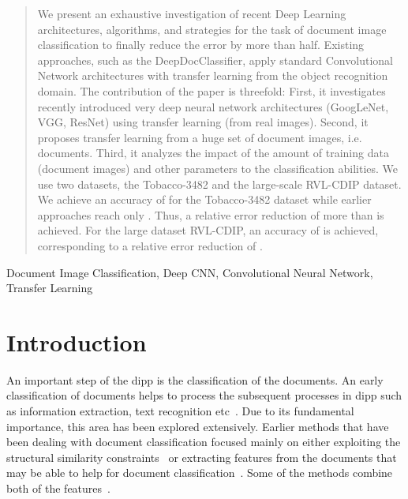 \documentclass[conference]{IEEEtran}
\begin{document}
\IEEEpeerreviewmaketitle
\begin{abstract}



We present an exhaustive investigation of recent Deep Learning architectures, algorithms, and strategies for the task of document image classification to finally reduce the error by more than half.
Existing approaches, such as the DeepDocClassifier, apply standard Convolutional Network architectures with transfer learning from the object recognition domain.
The contribution of the paper is threefold:
First, it investigates recently introduced very deep neural network architectures (GoogLeNet, VGG, ResNet) using transfer learning (from real images). 
Second, it proposes transfer learning from a huge set of document images, i.e.  documents. 
Third, it analyzes the impact of the amount of training data (document images) and other parameters to the classification abilities. 
We use two datasets, the Tobacco-3482 and the large-scale RVL-CDIP dataset.
We achieve an accuracy of  for the Tobacco-3482 dataset while earlier approaches reach only . Thus, a relative error reduction of more than  is achieved. For the large dataset RVL-CDIP, an accuracy of  is achieved, corresponding to a relative error reduction of .














\end{abstract}

\begin{IEEEkeywords}
Document Image Classification, Deep CNN, Convolutional Neural Network, Transfer Learning
\end{IEEEkeywords}



%
 
\section{Introduction}

An important step of the \ac{dipp} is the classification of the documents. 
An early classification of documents helps to process the subsequent processes in \ac{dipp} such as information extraction, text recognition etc~\cite{doclass_Dengel95}. Due to its fundamental importance, this area has been explored extensively. 
Earlier methods that have been dealing with document classification focused mainly on either exploiting the structural similarity constraints~\cite{doclass_Byun2000, doclass_shin} or extracting features from the documents that may be able to help for  document classification~\cite{doclass_Kumar12, doclass_Chen12, doclass_Kumar14}.
Some of the methods  combine both of the features~\cite{Collins-thompson02aclustering-based}.
\end{document}
